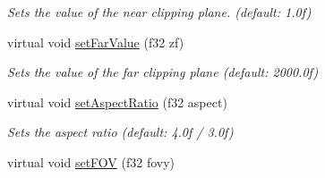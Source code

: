 \begin{DoxyCompactItemize}
\begin{DoxyCompactList}\small\item\em Sets the value of the near clipping plane. (default\-: 1.\-0f) \end{DoxyCompactList}\item 
\hypertarget{classirr_1_1scene_1_1_c_camera_scene_node_ab095815e7ad4c95bc54787563177fe59}{virtual void \hyperlink{classirr_1_1scene_1_1_c_camera_scene_node_ab095815e7ad4c95bc54787563177fe59}{set\-Far\-Value} (f32 zf)}\label{classirr_1_1scene_1_1_c_camera_scene_node_ab095815e7ad4c95bc54787563177fe59}

\begin{DoxyCompactList}\small\item\em Sets the value of the far clipping plane (default\-: 2000.\-0f) \end{DoxyCompactList}\item 
\hypertarget{classirr_1_1scene_1_1_c_camera_scene_node_a0cb6d45cc8122fb0e21731308f0ded23}{virtual void \hyperlink{classirr_1_1scene_1_1_c_camera_scene_node_a0cb6d45cc8122fb0e21731308f0ded23}{set\-Aspect\-Ratio} (f32 aspect)}\label{classirr_1_1scene_1_1_c_camera_scene_node_a0cb6d45cc8122fb0e21731308f0ded23}

\begin{DoxyCompactList}\small\item\em Sets the aspect ratio (default\-: 4.\-0f / 3.\-0f) \end{DoxyCompactList}\item 
\hypertarget{classirr_1_1scene_1_1_c_camera_scene_node_a905b7e939a1efc0a6b1857981392a30f}{virtual void \hyperlink{classirr_1_1scene_1_1_c_camera_scene_node_a905b7e939a1efc0a6b1857981392a30f}{set\-F\-O\-V} (f32 fovy)}\label{classirr_1_1scene_1_1_c_camera_scene_node_a905b7e939a1efc0a6b1857981392a30f}


\end{DoxyCompactItemize}
